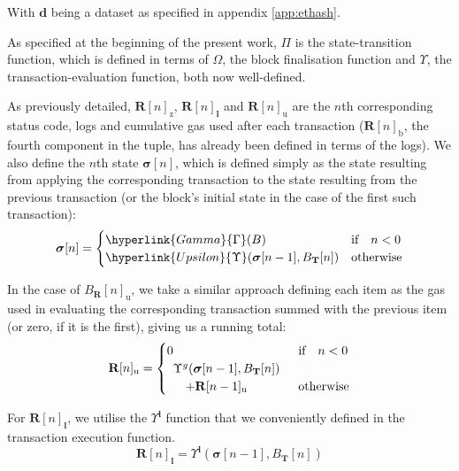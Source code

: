 \documentclass[9pt,oneside]{amsart}
\begin{document}
\begin{multicols}{2}
With $\mathbf{d}$ being a dataset as specified in appendix \ref{app:ethash}.

As specified at the beginning of the present work, \hyperlink{Pi}{$\Pi$} is the state-transition function, which is defined in terms of \hyperlink{Omega}{$\Omega$}, the block finalisation function and \hyperlink{Upsilon_state_transition}{$\Upsilon$}, the transaction-evaluation function, both now well-defined.

As previously detailed, $\mathbf{R}[n]_{\mathrm{z}}$, $\mathbf{R}[n]_{\mathbf{l}}$ and $\mathbf{R}[n]_{\mathrm{u}}$ are the $n$th corresponding status code, logs and cumulative gas used after each transaction ($\mathbf{R}[n]_{\mathrm{b}}$, the fourth component in the tuple, has already been defined in terms of the logs). We also define the $n$th state $\boldsymbol{\sigma}[n]$, which is defined simply as the state resulting from applying the corresponding transaction to the state resulting from the previous transaction (or the block's initial state in the case of the first such transaction):
\begin{equation}
\boldsymbol{\sigma}[n] = \begin{cases} \hyperlink{Gamma}{\Gamma}(B) & \text{if} \quad n < 0 \\ \hyperlink{Upsilon}{\Upsilon}(\boldsymbol{\sigma}[n - 1], B_{\mathbf{T}}[n]) & \text{otherwise} \end{cases}
\end{equation}

In the case of $B_{\mathbf{R}}[n]_{\mathrm{u}}$, we take a similar approach defining each item as the gas used in evaluating the corresponding transaction summed with the previous item (or zero, if it is the first), giving us a running total:
\begin{equation}
\mathbf{R}[n]_{\mathrm{u}} = \begin{cases} 0 & \text{if} \quad n < 0 \\
\begin{array}[b]{l}
\Upsilon^g(\boldsymbol{\sigma}[n - 1], B_{\mathbf{T}}[n])\\ \quad + \mathbf{R}[n-1]_{\mathrm{u}}
\end{array}
 & \text{otherwise} \end{cases}
\end{equation}

For $\mathbf{R}[n]_{\mathbf{l}}$, we utilise the \hyperlink{Upsilon_pow_l}{$\Upsilon^\mathbf{l}$} function that we conveniently defined in the transaction execution function.
\begin{equation}
\mathbf{R}[n]_{\mathbf{l}} =
\Upsilon^{\mathbf{l}}(\boldsymbol{\sigma}[n - 1], B_{\mathbf{T}}[n])
\end{equation}


\end{multicols}
\end{document}
